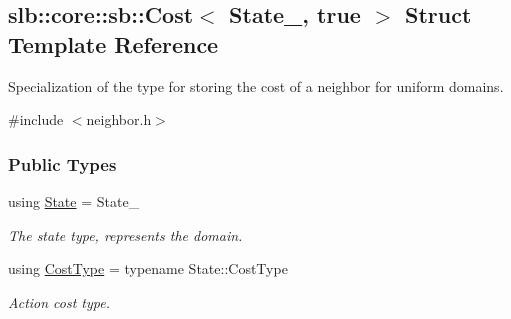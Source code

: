 \hypertarget{structslb_1_1core_1_1sb_1_1Cost_3_01State___00_01true_01_4}{}\subsection{slb\+:\+:core\+:\+:sb\+:\+:Cost$<$ State\+\_\+, true $>$ Struct Template Reference}
\label{structslb_1_1core_1_1sb_1_1Cost_3_01State___00_01true_01_4}


Specialization of the type for storing the cost of a neighbor for uniform domains.  




{\ttfamily \#include $<$neighbor.\+h$>$}

\subsubsection*{Public Types}
\begin{DoxyCompactItemize}
\item 
using \hyperlink{structslb_1_1core_1_1sb_1_1Cost_3_01State___00_01true_01_4_a205e1712d7e0e37db52599e38ce9fd32}{State} = State\+\_\+\hypertarget{structslb_1_1core_1_1sb_1_1Cost_3_01State___00_01true_01_4_a205e1712d7e0e37db52599e38ce9fd32}{}\label{structslb_1_1core_1_1sb_1_1Cost_3_01State___00_01true_01_4_a205e1712d7e0e37db52599e38ce9fd32}

\begin{DoxyCompactList}\small\item\em The state type, represents the domain. \end{DoxyCompactList}\item 
using \hyperlink{structslb_1_1core_1_1sb_1_1Cost_3_01State___00_01true_01_4_a13c4b693ea73bc79237bc51ec08f125c}{Cost\+Type} = typename State\+::\+Cost\+Type\hypertarget{structslb_1_1core_1_1sb_1_1Cost_3_01State___00_01true_01_4_a13c4b693ea73bc79237bc51ec08f125c}{}\label{structslb_1_1core_1_1sb_1_1Cost_3_01State___00_01true_01_4_a13c4b693ea73bc79237bc51ec08f125c}

\begin{DoxyCompactList}\small\item\em Action cost type. \end{DoxyCompactList}\end{DoxyCompactItemize}
